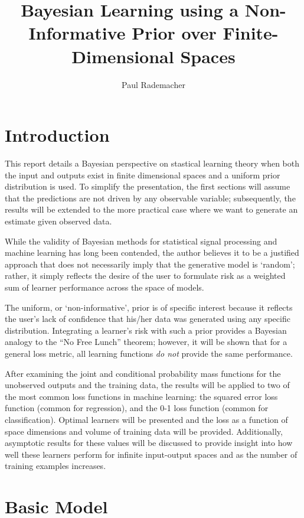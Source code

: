 \documentclass[12pt]{article}
\title{Bayesian Learning using a Non-Informative Prior over Finite-Dimensional Spaces}
\author{Paul Rademacher}
\begin{document}
\maketitle




\section{Introduction}

This report details a Bayesian perspective on stastical learning theory when both the input and outputs exist in finite dimensional spaces and a uniform prior distribution is used. To simplify the presentation, the first sections will assume that the predictions are not driven by any observable variable; subsequently, the results will be extended to the more practical case where we want to generate an estimate given observed data.

While the validity of Bayesian methods for statistical signal processing and machine learning has long been contended, the author believes it to be a justified approach that does not necessarily imply that the generative model is `random'; rather, it simply reflects the desire of the user to formulate risk as a weighted sum of learner performance across the space of models. 

The uniform, or `non-informative', prior is of specific interest because it reflects the user's lack of confidence that his/her data was generated using any specific distribution. Integrating a learner's risk with such a prior provides a Bayesian analogy to the ``No Free Lunch'' theorem; however, it will be shown that for a general loss metric, all learning functions \emph{do not} provide the same performance.

After examining the joint and conditional probability mass functions for the unobserved outputs and the training data, the results will be applied to two of the most common loss functions in machine learning: the squared error loss function (common for regression), and the 0-1 loss function (common for classification). Optimal learners will be presented and the loss as a function of space dimensions and volume of training data will be provided. Additionally, asymptotic results for these values will be discussed to provide insight into how well these learners perform for infinite input-output spaces and as the number of training examples increases. 




\section{Basic Model}
\end{document}
